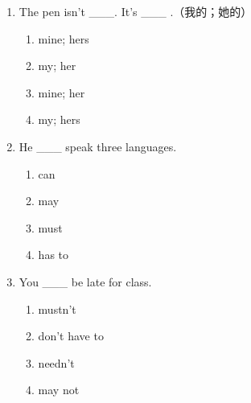 \documentclass[11pt,a4paper]{ctexart}
\begin{document}
\begin{enumerate}[leftmargin=*,itemsep=4pt]
\begin{enumerate}[label=\Alph*.,leftmargin=2em,itemsep=1pt,topsep=2pt]
\end{enumerate}
\item The pen isn’t \_\_\_. It’s \_\_\_ .（我的；她的）
\begin{enumerate}[label=\Alph*.,leftmargin=2em,itemsep=1pt,topsep=2pt]
\item mine; hers
\item my; her
\item mine; her
\item my; hers
\end{enumerate}
\item He \_\_\_ speak three languages.
\begin{enumerate}[label=\Alph*.,leftmargin=2em,itemsep=1pt,topsep=2pt]
\item can
\item may
\item must
\item has to
\end{enumerate}
\item You \_\_\_ be late for class.
\begin{enumerate}[label=\Alph*.,leftmargin=2em,itemsep=1pt,topsep=2pt]
\item mustn’t
\item don’t have to
\item needn’t
\item may not
\end{enumerate}
\end{enumerate}

\newpage
\end{document}
